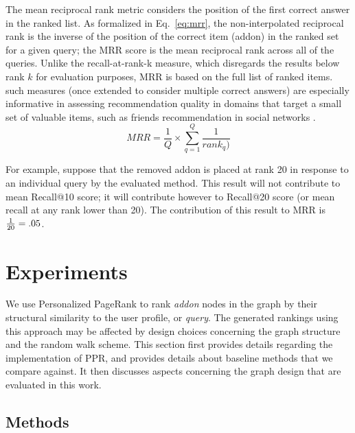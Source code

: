 \documentclass[11pt,oneside]{book}
\let\Oldsection\section
\renewcommand{\section}{\FloatBarrier\Oldsection}
\let\Oldsubsection\subsection
\renewcommand{\subsection}{\FloatBarrier\Oldsubsection}
\begin{document}
The mean reciprocal rank metric \citep{voorhees1999trec} considers the position of the first correct answer in the ranked list.  As formalized in Eq.~\eqref{eq:mrr}, the non-interpolated reciprocal rank is the inverse of the position of the correct item (addon) in the ranked set for a given query; the MRR score is the mean reciprocal rank across all of the queries. Unlike the recall-at-rank-k measure, which disregards the results below rank $k$ for evaluation purposes, MRR is based on the full list of ranked items. such measures (once extended to consider multiple correct answers) are especially informative in assessing recommendation quality in domains that target a small set of valuable items, such as friends recommendation in social
networks \citep{chen2006less}. 
\begin{equation}
 MRR = \frac{1}{Q} \times \displaystyle\sum\limits_{q=1}^{Q} \frac{1}{rank_q)}
\label{eq:mrr}
\end{equation}

For example, suppose that the removed addon is placed at rank 20 in response to an individual query by the evaluated method. This result will not contribute to mean Recall@10 score; it will contribute however to Recall@20 score (or mean recall at any rank lower than 20). The contribution of this result to MRR is ${1 \over 20}=.05$.

\section{Experiments}
\label{sec:experiments}

We use Personalized PageRank to rank {\it addon} nodes in
the graph by their structural similarity to the user profile, or {\it
  query}. The generated rankings using this approach may be affected
by design choices concerning the graph structure and the random walk scheme. This section first provides details regarding the implementation of PPR, and provides details about baseline methods that we compare against. It then discusses aspects concerning the graph design that are evaluated in this work.

\subsection{Methods}
\label{sec:methods}
\end{document}
